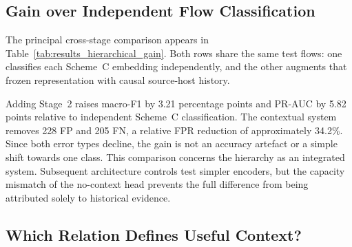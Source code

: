 \documentclass[11pt,fleqn]{report}
\begin{document}
\subsection{Gain over Independent Flow Classification}
\label{subsubsec:results_hierarchical_gain}

The principal cross-stage comparison appears in Table~\ref{tab:results_hierarchical_gain}. Both rows share the same test flows: one classifies each Scheme~C embedding independently, and the other augments that frozen representation with causal source-host history.

\begin{table}[H]
    \centering
    \caption{Independent Stage~1 classification and the complete hierarchical system on the common full-data manifest.}
    \label{tab:results_hierarchical_gain}
\end{table}

Adding Stage~2 raises macro-F1 by 3.21 percentage points and PR-AUC by 5.82 points relative to independent Scheme~C classification. The contextual system removes 228 FP and 205 FN, a relative FPR reduction of approximately 34.2\%. Since both error types decline, the gain is not an accuracy artefact or a simple shift towards one class. This comparison concerns the hierarchy as an integrated system. Subsequent architecture controls test simpler encoders, but the capacity mismatch of the no-context head prevents the full difference from being attributed solely to historical evidence.


\subsection{Which Relation Defines Useful Context?}
\label{subsubsec:results_context_relation}
\end{document}

